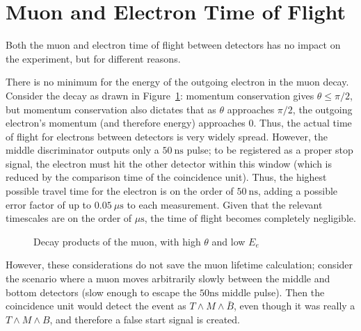 \section{Muon and Electron Time of Flight}
\label{timeofflight}

Both the muon and electron time of flight between detectors has no impact on the experiment, but for different reasons.

There is no minimum for the energy of the outgoing electron in the muon decay. Consider the decay as drawn in Figure~\ref{figure:electronpi}: momentum conservation gives $\theta \leq \pi/2$, but momentum conservation also dictates that as $\theta$ approaches $\pi/2$, the outgoing electron's momentum (and therefore energy) approaches $0$. Thus, the actual time of flight for electrons between detectors is very widely spread. However, the middle discriminator outputs only a $50~\mathrm{ns}$ pulse; to be registered as a proper stop signal, the electron must hit the other detector within this window (which is reduced by the comparison time of the coincidence unit). Thus, the highest possible travel time for the electron is on the order of $50~\mathrm{ns}$, adding a possible error factor of up to $0.05~\mu\mathrm{s}$ to each measurement. Given that the relevant timescales are on the order of $\mu\mathrm{s}$, the time of flight becomes completely negligible.

\begin{figure}[htbp]
\begin{center}
 

 
\caption{\small{Decay products of the muon, with high $\theta$ and low $E_{e}$}}
\label{figure:electronpi}
\end{center}
\end{figure}

However, these considerations do not save the muon lifetime calculation; consider the scenario where a muon moves arbitrarily slowly between the middle and bottom detectors (slow enough to escape the $50 \mathrm{ns}$ middle pulse). Then the coincidence unit would detect the event as $T \wedge M \wedge \bar{B}$, even though it was really a $T \wedge M \wedge B$, and therefore a false start signal is created.

